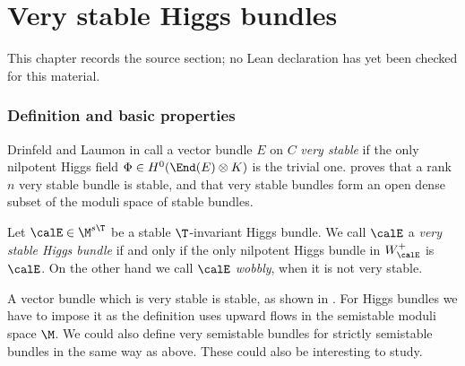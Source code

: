 \chapter{Very stable Higgs bundles}
\label{very-stable-higgs-bundles-equivariant-multiplicity-mirror-symmetry-chapter-04}

\begin{remark}
\label{very-stable-higgs-bundles-equivariant-multiplicity-mirror-symmetry-chapter-04-source}
This chapter records the source section; no Lean declaration has yet been checked for this material.
\notready
\end{remark}

\label{verystable}


\subsection{Definition and basic properties}
Drinfeld and Laumon in \cite[Definition 3.4]{laumon} call a vector bundle $E$ on $C$ {\em very stable} if the only nilpotent Higgs field $\Phi
\in H^0(\End(E)\otimes K)$ is the trivial one.  \cite[Proposition 3.5]{laumon} proves that a rank $n$ very stable bundle is stable, and that very stable bundles form an open dense subset of the moduli space of stable  bundles.

\begin{definition}
\notready Let $\calE\in \M^{s \T}$ be a stable $\T$-invariant Higgs bundle. We call $\calE$ a {\em very stable Higgs bundle} if and only if  the only nilpotent Higgs bundle in $W_\calE^+$ is $\calE$.  On the other hand we call $\calE$ {\em wobbly}, when it is not very stable.
\end{definition}

\begin{remark}
\notready A vector  bundle which is very stable is stable, as shown in \cite[Proposition 3.5]{laumon}. For Higgs bundles we have to impose it as the definition uses upward flows in the semistable moduli space $\M$. We could also define very semistable bundles for strictly semistable bundles in the same way as above. These could also be interesting to study.
	\end{remark}

